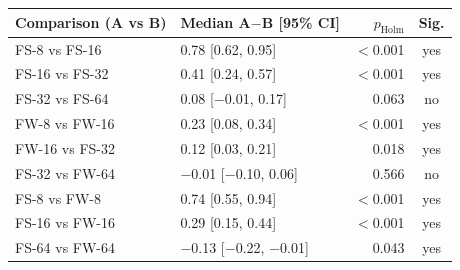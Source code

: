 \begin{tabular}{llrc}
\toprule
Comparison (A vs B) & Median A$-$B [95\% CI] & $p_\mathrm{Holm}$ & Sig. \\
\midrule
FS-8 vs FS-16 & 0.78 [0.62, 0.95] & $<$0.001 & yes \\
FS-16 vs FS-32 & 0.41 [0.24, 0.57] & $<$0.001 & yes \\
FS-32 vs FS-64 & 0.08 [$-$0.01, 0.17] & 0.063 & no \\
FW-8 vs FW-16 & 0.23 [0.08, 0.34] & $<$0.001 & yes \\
FW-16 vs FS-32 & 0.12 [0.03, 0.21] & 0.018 & yes \\
FS-32 vs FW-64 & $-$0.01 [$-$0.10, 0.06] & 0.566 & no \\
FS-8 vs FW-8 & 0.74 [0.55, 0.94] & $<$0.001 & yes \\
FS-16 vs FW-16 & 0.29 [0.15, 0.44] & $<$0.001 & yes \\
FS-64 vs FW-64 & $-$0.13 [$-$0.22, $-$0.01] & 0.043 & yes \\
\bottomrule
\end{tabular}
